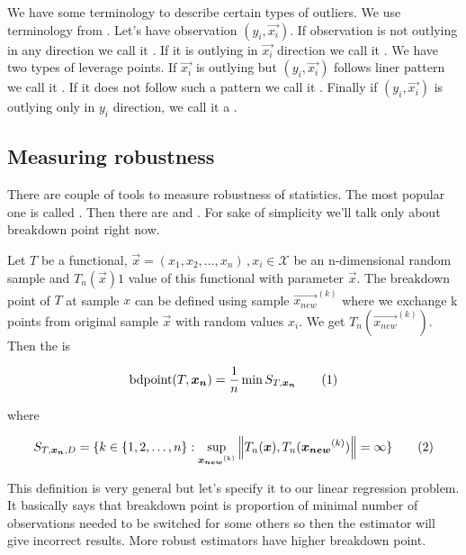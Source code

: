 We have some terminology to describe certain types of outliers. We use terminology from \cite{rouss:1990}. Let's have observation $(y_i, \vec{x_i})$. If observation is not outlying in any direction we call it  . If it is outlying in $\vec{x_i}$ direction we call it . We have two types of leverage points. If $\vec{x_i}$ is outlying but $(y_i, \vec{x_i})$ follows liner pattern we call it  . If it does not follow such a pattern we call it . Finally if $(y_i, \vec{x_i})$ is  outlying only in $y_i$  direction, we call it a .

\subsection{Measuring robustness}
There are couple of tools to measure robustness of statistics. The most popular one is called . Then there are  and . For sake of simplicity we'll talk only about breakdown point right now. 

\begin{definition}
    Let $T$ be a functional, $\vec{x} = (x_1, x_2,\ldots,x_n)\,, x_i \in \mathcal{X}$ be an n-dimensional random sample and $T_n(\vec{x})1$ value of this functional with parameter $\vec{x}$. The breakdown point of $T$ at sample $x$ can be defined using sample $\vec{x_{new}}^(k)$ where we exchange k points from original sample $\vec{x}$ with random values $x_i$. We get $T_n(\vec{x_{new}}^{(k)})$. Then the  is 


\begin{equation}
    \bdpoint(T,\vec{x_n} ) = \frac{1}{n} \min S_{T, \vec{x_n}}  \numberthis
\end{equation}

where 

\begin{equation}
   S_{T, \vec{x_n}, D} =   \{{k \in \{{1,2, \ldots ,n\}} : \sup_{ \vec{x_{new}}^{(k)} } \norm{T_n(\vec{x}), T_n(\vec{x_{new}}^{(k)})} = \infty   \}}   \numberthis
\end{equation}


\end{definition}

This definition is very general but let's specify it to our linear regression problem. It basically says that breakdown point is proportion of minimal number of observations needed to be switched for some others so then the estimator will give incorrect results. More robust estimators have higher breakdown point. 

